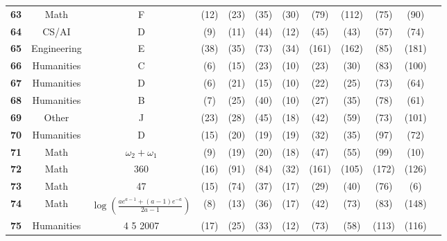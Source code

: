\begin{table*}[htb]
\begin{center}
\begin{tiny}
\begin{tabular}{l|c|c|ccccccccc}
\textbf{63} & Math & F  & \C [F] (12) & \X (23) & \C [F] (35) & \C [F] (30) & \X [B] (79) & \X [B] (112) & \X [D] (75) & \C [F] (90)\\
\textbf{64} & CS/AI & D  & \C [D] (9) & \X [B] (11) & \X (44) & \X [B] (12) & \C [D] (45) & \X [B] (43) & \X [B] (57) & \X [B] (74)\\
\textbf{65} & Engineering & E  & \C [E] (38) & \X [B] (35) & \X (73) & \X [B] (34) & \X [D] (161) & \X [B] (162) & \C [E] (85) & \X (181)\\
\textbf{66} & Humanities & C  & \C [C] (6) & \X [E] (15) & \X (23) & \C [C] (10) & \X [E] (23) & \X [F] (30) & \C [C] (83) & \X [E] (100)\\
\textbf{67} & Humanities & D  & \C [D] (6) & \X [A] (21) & \X [A] (15) & \X [A] (10) & \X [A] (22) & \X [B] (25) & \X [C] (73) & \X [B] (64)\\
\textbf{68} & Humanities & B  & \X [A] (7) & \X [C] (25) & \X (40) & \X [C] (10) & \X [C] (27) & \X [C] (35) & \X [A] (78) & \X (61)\\
\textbf{69} & Other & J  & \X [N] (23) & \X [P] (28) & \X (45) & \X [L] (18) & \X [A] (42) & \X [S] (59) & \X [L] (73) & \X [D] (101)\\
\textbf{70} & Humanities & D  & \X [A] (15) & \X [A] (20) & \C [D] (19) & \C [D] (19) & \C [D] (32) & \X [F] (35) & \X [A] (97) & \X [F](72)\\
\textbf{71} & Math & $\omega_2+\omega_1$  & \X (9) & \X (19) & \X (20) & \X (18) & \X (47) & \X (55) & \X (99) & \X (10)\\
\textbf{72} & Math & 360  & \C (16) & \X (91) & \X (84) & \C (32) & \X (161) & \C (105) & \X (172) & \X (126)\\
\textbf{73} & Math & 47  & \X (15) & \X (74) & \X (37) & \X (17) & \X (29) & \X (40) & \X (76) & \X (6)\\
\textbf{74} & Math & $\log(\frac{ae^{a-1}+(a-1)e^{-a}}{2a-1})$  & \X (8) & \X (13) & \X (36) & \X (17) & \X (42) & \X (73) & \X (83) & \X (148)\\
\textbf{75} & Humanities & 4 5 2007  & \X (17) & \C (25) & \C (33) & \X (12) & \C (73) & \X (58) & \X (113) & \X (116)\\


\end{tabular}
\end{tiny}
\end{center}
\end{table*}
